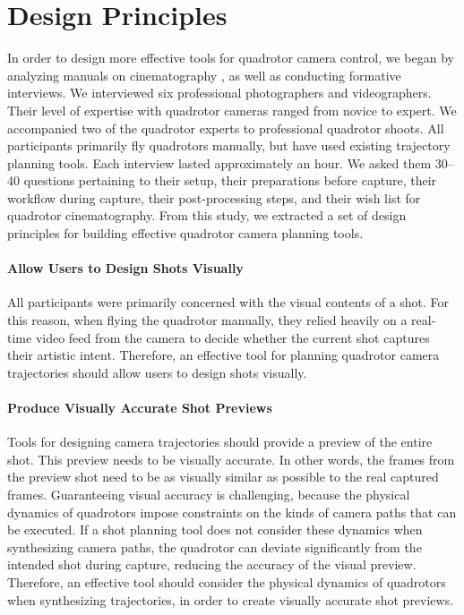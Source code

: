 \section{Design Principles}
\label{sec:ch2:design}

In order to design more effective tools for quadrotor camera control, we began by analyzing manuals on cinematography \cite{mascelli:1965,arijon:1976,katz:1991}, as well as conducting formative interviews. 
We interviewed six professional photographers and videographers.
Their level of expertise with quadrotor cameras ranged from novice to expert.
We accompanied two of the quadrotor experts to professional quadrotor shoots.
All participants primarily fly quadrotors manually, but have used existing trajectory planning tools.
Each interview lasted approximately an hour.
We asked them 30--40 questions pertaining to their setup, their preparations before capture, their workflow during capture, their post-processing steps, and their wish list for quadrotor cinematography.
From this study, we extracted a set of design principles for building effective quadrotor camera planning tools.   

\paragraph{Allow Users to Design Shots Visually}
All participants were primarily concerned with the visual contents of a shot.
For this reason, when flying the quadrotor manually, they relied heavily on a real-time video feed from the camera to decide whether the current shot captures their artistic intent.
Therefore, an effective tool for planning quadrotor camera trajectories should allow users to design shots visually. 

\paragraph{Produce Visually Accurate Shot Previews}
Tools for designing camera trajectories should provide a preview of the entire shot.
This preview needs to be visually accurate. In other words, the frames from the preview shot need to be as visually similar as possible to the real captured frames.
Guaranteeing visual accuracy is challenging, because the physical dynamics of quadrotors impose constraints on the kinds of camera paths that can be executed.
If a shot planning tool does not consider these dynamics when synthesizing camera paths, the quadrotor can deviate significantly from the intended shot during capture, reducing the accuracy of the visual preview.
Therefore, an effective tool should consider the physical dynamics of quadrotors when synthesizing trajectories, in order to create visually accurate shot previews. 

